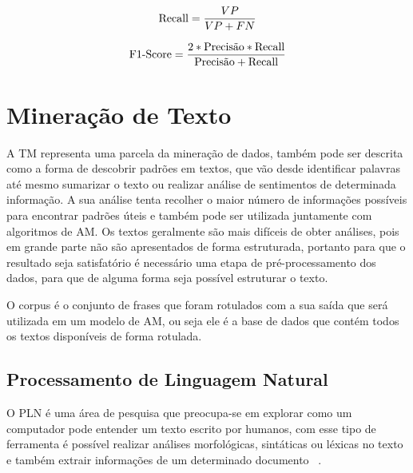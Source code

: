           \begin{equation}\label{recall}
            \begin{aligned}
              \textup{Recall} = \frac{VP}{VP+FN}
          \end{aligned} 
          \end{equation}


          \begin{equation}\label{f1score}
            \begin{aligned}
              \textup{F$1$-Score} = \frac{2*\textup{Precisão}*\textup{Recall}}{\textup{Precisão}+\textup{Recall}}
          \end{aligned} 
          \end{equation}

\section{Mineração de Texto}

          A \acrshort{TM} representa uma parcela da mineração de dados, também pode ser descrita como a forma 
        de descobrir padrões em textos, que vão desde identificar palavras até mesmo sumarizar o texto ou realizar análise de sentimentos
        de determinada informação. A sua análise tenta recolher o maior número de informações possíveis para encontrar padrões úteis e também 
        pode ser utilizada juntamente com algoritmos de \acrshort{AM}. Os textos geralmente são mais difíceis de obter análises, pois em grande
        parte não são apresentados de forma estruturada, portanto para que o resultado seja satisfatório é necessário uma etapa de pré-processamento
        dos dados, para que de alguma forma seja possível estruturar o texto.

            O corpus é o conjunto de frases que foram rotulados com a sua saída que será utilizada em um modelo de \acrshort{AM}, ou seja ele é 
        a base de dados que contém todos os textos disponíveis de forma rotulada.

  \subsection{Processamento de Linguagem Natural}

          O \acrshort{PLN} é uma área de pesquisa que preocupa-se em explorar como um computador pode entender um texto escrito por humanos, com esse tipo 
          de ferramenta é possível realizar análises morfológicas, sintáticas ou léxicas no texto e também extrair informações de um determinado
          documento ~\cite{liddy2001natural}. 

